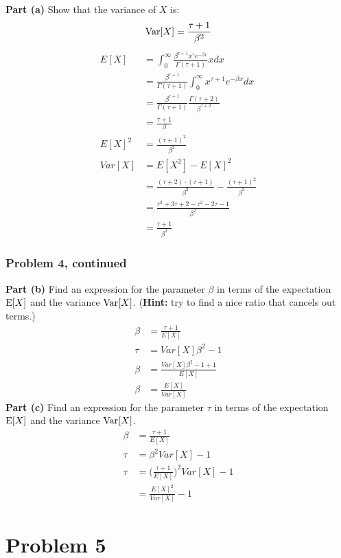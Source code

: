 \documentclass[12pt]{article}
\theoremstyle{definition}
\begin{document}
\noindent
{\bf Part (a)} Show that the variance of $X$ is:
$$
\hbox{Var}[X] = \frac{\tau + 1}{\beta^2}
$$
\begin{align*}
E[X] &= \int_0^\infty \frac{\beta^{\tau + 1}x^\tau e^{-\beta x}}{\Gamma(\tau + 1)}xdx\\
&= \frac{\beta^{\tau + 1}}{\Gamma(\tau + 1)} \int_0^\infty x^{\tau + 1}e^{-\beta x} dx\\
&= \frac{\beta^{\tau + 1}}{\Gamma(\tau + 1)} \frac{\Gamma(\tau + 2)}{\beta^{\tau + 2}}\\
&= \frac{\tau + 1}{\beta}\\
E[X]^2 &= \frac{(\tau + 1)^2}{\beta^2}\\
Var[X] &= E[X^2] - E[X]^2\\
&= \frac{(\tau + 2) \cdot (\tau + 1)}{\beta^2} - \frac{(\tau + 1)^2}{\beta^2}\\
&= \frac{\tau^2 + 3\tau + 2 - \tau^2 - 2\tau - 1}{\beta^2}\\
&= \frac{\tau + 1}{\beta^2}
\end{align*}
\newpage
\subsubsection*{Problem 4, continued}

\noindent
{\bf Part (b)} Find an expression for the parameter $\beta$ in terms of the expectation $\hbox{E}[X]$ and the variance $\hbox{Var}[X]$. ({\bf Hint:} try to find a nice ratio that cancels out terms.)
\begin{align*}
\beta &= \frac{\tau + 1}{E[X]}\\
\tau &= Var[X]\beta^2 - 1\\
\beta &= \frac{Var[X]\beta^2 - 1 + 1}{E[X]}\\
\beta &= \frac{E[X]}{Var[X]}
\end{align*}
\noindent
{\bf Part (c)} Find an expression for the parameter $\tau$ in terms of the expectation $\hbox{E}[X]$ and the variance $\hbox{Var}[X]$.
\begin{align*}
\beta &= \frac{\tau + 1}{E[X]}\\
\tau &= \beta^2 Var[X] - 1\\
\tau &= \biggr(\frac{\tau + 1}{E[X]}\biggr)^2 Var[X] - 1\\
&= \frac{E[X]^2}{Var[X]} - 1
\end{align*}




\newpage
\section*{Problem 5}
\end{document}
